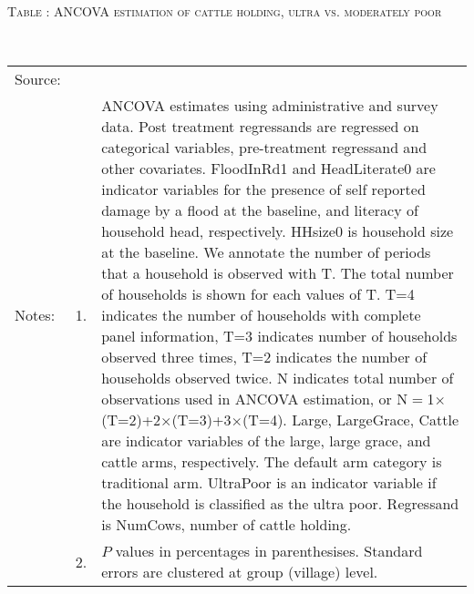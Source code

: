\hspace{-1cm}\begin{minipage}[t]{14cm}
\hfil\textsc{\normalsize Table \thetable: ANCOVA estimation of cattle holding, ultra vs. moderately poor\label{tab ANCOVA NumCows poor}}\\
\setlength{\tabcolsep}{1pt}
\setlength{\baselineskip}{8pt}
\renewcommand{\arraystretch}{.55}
\hfil{}\\
\renewcommand{\arraystretch}{.8}
\setlength{\tabcolsep}{1pt}
\begin{tabular}{>{\hfill\scriptsize}p{1cm}<{}>{\hfill\scriptsize}p{.25cm}<{}>{\scriptsize}p{12cm}<{\hfill}}
Source:& \multicolumn{2}{l}{\scriptsize Estimated with GUK administrative and survey data.}\\
Notes: & 1. & ANCOVA estimates using administrative and survey data. Post treatment regressands are regressed on categorical variables, pre-treatment regressand and other covariates. \textsf{FloodInRd1} and \textsf{HeadLiterate0} are indicator variables for the presence of self reported damage by a flood at the baseline, and literacy of household head, respectively. \textsf{HHsize0} is household size at the baseline. We annotate the number of periods that a household is observed with \textsf{T}. The total number of households is shown for each values of \textsf{T}. \textsf{T=4} indicates the number of households with complete panel information, \textsf{T=3} indicates number of households observed three times, \textsf{T=2} indicates the number of households observed twice. \textsf{N} indicates total number of observations used in ANCOVA estimation, or \textsf{N$=$1$\times$(T=2)+2$\times$(T=3)+3$\times$(T=4)}.  \textsf{Large}, \textsf{LargeGrace}, \textsf{Cattle} are indicator variables of the \textsf{large}, \textsf{large grace}, and \textsf{cattle} arms, respectively. The default arm category is \textsf{traditional} arm. \textsf{UltraPoor} is an indicator variable if the household is classified as the ultra poor. Regressand is \textsf{NumCows}, number of cattle holding. \\
& 2. & $P$ values in percentages in parenthesises. Standard errors are clustered at group (village) level.
\end{tabular}
\end{minipage}

